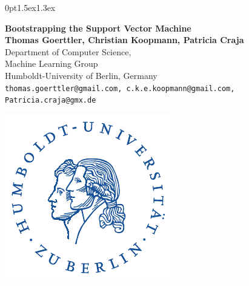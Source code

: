 \documentclass[a1,portrait]{a0poster}
\begin{document}
	\titlespacing*{\section}
	{0pt}{1.5ex}{1.3ex}


\setlength{\linewidth}{1450pt}

\begin{minipage}[t]{0.75\linewidth}
\huge \color{hu} \textbf{Bootstrapping the Support Vector Machine} \color{Black}\\[0.5cm] %
\large \textbf{Thomas Goerttler, Christian Koopmann, Patricia Craja}\\[0.5cm] %
\large Department of Computer Science,\\
\large Machine Learning Group\\[0.4cm] %
\large Humboldt-University of Berlin, Germany\\
\normalsize \texttt{thomas.goerttler@gmail.com, c.k.e.koopmann@gmail.com, Patricia.craja@gmx.de}\\
\end{minipage}
%
\begin{minipage}[t]{0.24\linewidth}
\vspace{-50pt}
\raggedleft
\includegraphics[width=\linewidth]{husiegel_bw.pdf}%
\vfill
\end{minipage}
\end{document}
